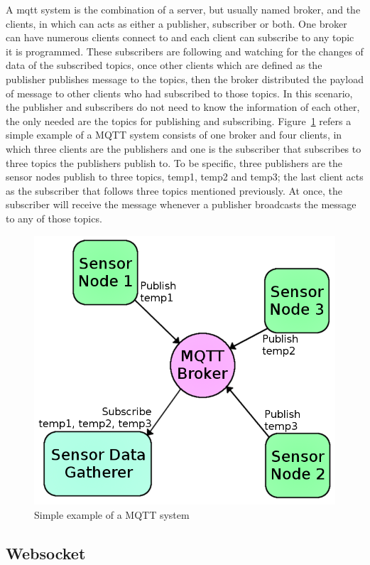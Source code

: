     A \gls{mqtt} system is the combination of a server, but usually named broker, and the clients, in which can acts as either a publisher, subscriber or both. One broker can have numerous clients connect to and each client can subscribe to any topic it is programmed. These subscribers are following and watching for the changes of data of the subscribed topics, once other clients which are defined as the publisher publishes message to the topics, then the broker distributed the payload of message to other clients who had subscribed to those topics. In this scenario, the publisher and subscribers do not need to know the information of each other, the only needed are the topics for publishing and subscribing. Figure~\ref{fig:mqttEg} refers a simple example of a MQTT system consists of one broker and four clients, in which three clients are the publishers and one is the subscriber that subscribes to three topics the publishers publish to. To be specific, three publishers are the sensor nodes publish to three topics, temp1, temp2 and temp3; the last client acts as the subscriber that follows three topics mentioned previously. At once, the subscriber will receive the message whenever a publisher broadcasts the message to any of those topics.
    \begin{figure}[!ht]
      \begin{center}
        \includegraphics[scale=0.4]{images/mqttEg.png}
        \caption{Simple example of a MQTT system}
        \label{fig:mqttEg}
      \end{center}
    \end{figure}

    \subsection{Websocket}




  


